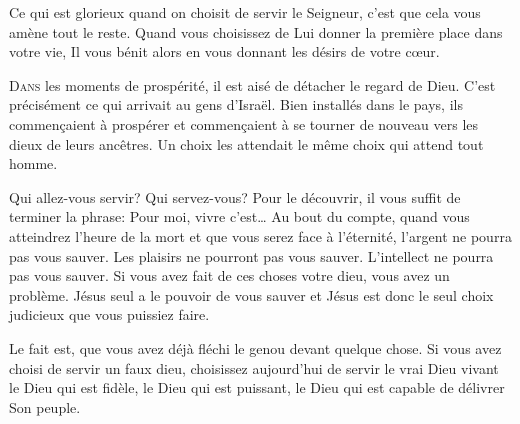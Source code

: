 Ce qui est glorieux quand on choisit de servir le Seigneur,
 c'est que cela vous amène tout le reste.
 Quand vous choisissez de Lui donner la première place dans votre vie,
 Il vous bénit alors en vous donnant les désirs de votre c\oe{}ur. 

\dvrule







\lettrine{D}{ans} les moments de prospérité,
 il est aisé de détacher le regard de Dieu.
 C'est précisément ce qui arrivait au gens d'Israël.
 Bien installés dans le pays, ils commen\c{c}aient à prospérer
 \ocadr et commen\c{c}aient à se tourner de nouveau vers les dieux
 de leurs ancêtres.
 Un choix les attendait \ocadr le même choix qui attend tout homme.


Qui allez-vous servir? Qui servez-vous? Pour le découvrir,
 il vous suffit de terminer la phrase:
 \Og Pour moi, vivre c'est\dots{} \Fg{}
 Au bout du compte, quand vous atteindrez l'heure de la mort
 et que vous serez face à l'éternité, l'argent ne pourra pas vous sauver.
 Les plaisirs ne pourront pas vous sauver.
 L'intellect ne pourra pas vous sauver.
 Si vous avez fait de ces choses votre dieu, vous avez un problème.
 Jésus seul a le pouvoir de vous sauver
 et Jésus est donc le seul choix judicieux que vous puissiez faire.

Le fait est, que vous avez déjà fléchi le genou devant quelque chose.
 Si vous avez choisi de servir un faux dieu,
 choisissez aujourd'hui de servir le vrai Dieu vivant
 \ocadr le Dieu qui est fidèle, le Dieu qui est puissant,
 le Dieu qui est capable de délivrer Son peuple. 

